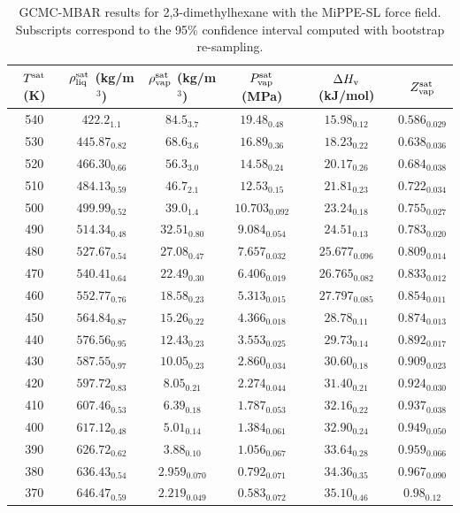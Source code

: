 \documentclass[journal=jctc,manuscript=article]{achemso}
\begin{document}
\begin{table}[htb!]
	\caption{GCMC-MBAR results for 2,3-dimethylhexane with the MiPPE-SL force field. Subscripts correspond to the 95\% confidence interval computed with bootstrap re-sampling.}
	\begin{center}
		\begin{tabular}{|c|c|c|c|c|c|}
			\hline
			$T^{\rm sat}$ (K) & $\rho_{\rm liq}^{\rm sat}$ (kg/m$^3$) & $\rho_{\rm vap}^{\rm sat}$ (kg/m$^3$) & $P_{\rm vap}^{\rm sat}$ (MPa) & $\Delta H_{\rm v}$ (kJ/mol) & $Z_{\rm vap}^{\rm sat}$ \\ \hline
			540 & $422.2_{1.1}$ & $84.5_{3.7}$ & $19.48_{0.48}$ & $15.98_{0.12}$ & $0.586_{0.029}$ \\
			530 & $445.87_{0.82}$ & $68.6_{3.6}$ & $16.89_{0.36}$ & $18.23_{0.22}$ & $0.638_{0.036}$ \\
			520 & $466.30_{0.66}$ & $56.3_{3.0}$ & $14.58_{0.24}$ & $20.17_{0.26}$ & $0.684_{0.038}$ \\
			510 & $484.13_{0.59}$ & $46.7_{2.1}$ & $12.53_{0.15}$ & $21.81_{0.23}$ & $0.722_{0.034}$ \\
			500 & $499.99_{0.52}$ & $39.0_{1.4}$ & $10.703_{0.092}$ & $23.24_{0.18}$ & $0.755_{0.027}$ \\
			490 & $514.34_{0.48}$ & $32.51_{0.80}$ & $9.084_{0.054}$ & $24.51_{0.13}$ & $0.783_{0.020}$ \\
			480 & $527.67_{0.54}$ & $27.08_{0.47}$ & $7.657_{0.032}$ & $25.677_{0.096}$ & $0.809_{0.014}$ \\
			470 & $540.41_{0.64}$ & $22.49_{0.30}$ & $6.406_{0.019}$ & $26.765_{0.082}$ & $0.833_{0.012}$ \\
			460 & $552.77_{0.76}$ & $18.58_{0.23}$ & $5.313_{0.015}$ & $27.797_{0.085}$ & $0.854_{0.011}$ \\
			450 & $564.84_{0.87}$ & $15.26_{0.22}$ & $4.366_{0.018}$ & $28.78_{0.11}$ & $0.874_{0.013}$ \\
			440 & $576.56_{0.95}$ & $12.43_{0.23}$ & $3.553_{0.025}$ & $29.73_{0.14}$ & $0.892_{0.017}$ \\
			430 & $587.55_{0.97}$ & $10.05_{0.23}$ & $2.860_{0.034}$ & $30.60_{0.18}$ & $0.909_{0.023}$ \\
			420 & $597.72_{0.83}$ & $8.05_{0.21}$ & $2.274_{0.044}$ & $31.40_{0.21}$ & $0.924_{0.030}$ \\
			410 & $607.46_{0.53}$ & $6.39_{0.18}$ & $1.787_{0.053}$ & $32.16_{0.22}$ & $0.937_{0.038}$ \\
			400 & $617.12_{0.48}$ & $5.01_{0.14}$ & $1.384_{0.061}$ & $32.90_{0.24}$ & $0.949_{0.050}$ \\
			390 & $626.72_{0.62}$ & $3.88_{0.10}$ & $1.056_{0.067}$ & $33.64_{0.28}$ & $0.959_{0.066}$ \\
			380 & $636.43_{0.54}$ & $2.959_{0.070}$ & $0.792_{0.071}$ & $34.36_{0.35}$ & $0.967_{0.090}$ \\
			370 & $646.47_{0.59}$ & $2.219_{0.049}$ & $0.583_{0.072}$ & $35.10_{0.46}$ & $0.98_{0.12}$ \\
			\hline
		\end{tabular}
	\end{center}
\end{table}
\end{document}
